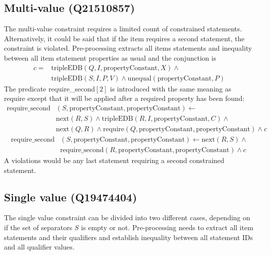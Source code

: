 \documentclass[hyperref,bachelorofscience,fleqn]{cgvpub}
\begin{document}
\subsection{Multi-value (Q21510857)}
The multi-value constraint requires a limited count of constrained statements. Alternatively, it could be said that if the item requires a second statement, the constraint is violated. Pre-processing extracts all items statements and inequality between all item statement properties as usual and the conjunction is 
\begin{equation*}
\begin{split}
c = &\text{tripleEDB}(Q, I, \text{propertyConstant}, X) \wedge \\
&\text{tripleEDB}(S, I, P, V) \wedge \text{unequal}(\text{propertyConstant}, P)
\end{split}
\end{equation*}
The predicate require\_second\([2]\) is introduced with the same meaning as require except that it will be applied after a required property has been found:
\begin{equation*}
\begin{split}
\text{require\_second}&(S, \text{propertyConstant}, \text{propertyConstant}) \leftarrow \\
&\text{next}(R, S) \wedge \text{tripleEDB}(R, I, \text{propertyConstant}, C) \wedge \\
&\text{next}(Q, R) \wedge \text{require}(Q, \text{propertyConstant}, \text{propertyConstant})  \wedge c
\end{split}
\end{equation*}
\begin{equation*}
\begin{split}
\text{require\_second}&(S, \text{propertyConstant}, \text{propertyConstant}) \leftarrow \text{next}(R, S) \wedge \\
&\text{require\_second}(R, \text{propertyConstant}, \text{propertyConstant}) \wedge c
\end{split}
\end{equation*}
A violations would be any last statement requiring a second constrained statement.\\

\subsection{Single value (Q19474404)}\label{subsec_3_single_value}
The single value constraint can be divided into two different cases, depending on if the set of separators \(S\) is empty or not. Pre-processing needs to extract all item statements and their qualifiers and establish inequality between all statement IDs and all qualifier values.
\end{document}
